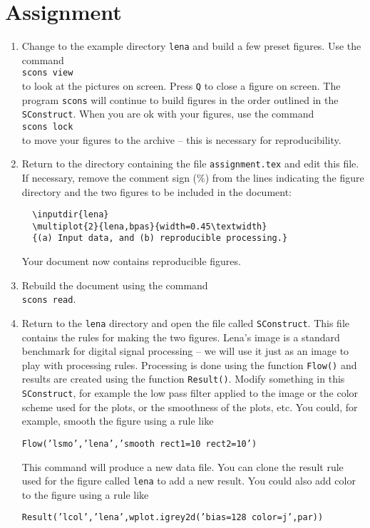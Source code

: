 \section{Assignment}

\begin{enumerate}
\item Change to the example directory \texttt{lena} and build a few
  preset figures. Use the command \\
  \texttt{scons view} \\
  to look at the pictures on screen. Press \texttt{Q} to close a
  figure on screen. The program \texttt{scons} will continue to build
  figures in the order outlined in the \texttt{SConstruct}. When you
  are ok with your figures, use the command \\
  \texttt{scons lock} \\
  to move your figures to the archive -- this is necessary for
  reproducibility.
\item Return to the directory containing the file \texttt{assignment.tex}
  and edit this file. If necessary, remove the comment sign (\%) from
  the lines indicating the figure directory and the two figures to be
  included in the document:
  \begin{verbatim}
  \inputdir{lena}
  \multiplot{2}{lena,bpas}{width=0.45\textwidth}
  {(a) Input data, and (b) reproducible processing.}
  \end{verbatim}
  Your document now contains reproducible figures.
\item Rebuild the document using the command \\
  \texttt{scons read}.
\item Return to the \texttt{lena} directory and open the file called
  \texttt{SConstruct}. This file contains the rules for making the two
  figures. Lena's image is a standard benchmark for digital signal
  processing -- we will use it just as an image to play with
  processing rules. Processing is done using the function
  \texttt{Flow()} and results are created using the function
  \texttt{Result()}. Modify something in this \texttt{SConstruct}, for
  example the low pass filter applied to the image or the color scheme
  used for the plots, or the smoothness of the plots, etc.
  You could, for example, smooth the figure using a rule like
  \begin{center}
    \texttt{Flow('lsmo','lena','smooth rect1=10 rect2=10')}
  \end{center}
  This command will produce a new data file. You can clone the result
  rule used for the figure called \texttt{lena} to add a new result.
  You could also add color to the figure using a rule like
  \begin{center}
    \texttt{Result('lcol','lena',wplot.igrey2d('bias=128 color=j',par))}
  \end{center}
  

\end{enumerate}
